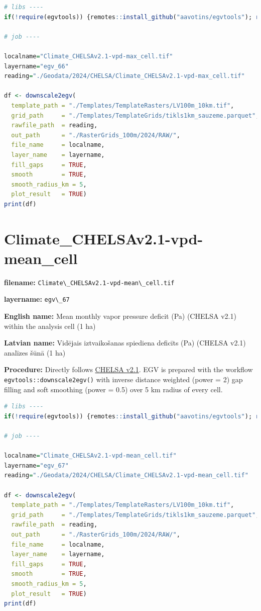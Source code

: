 \documentclass[
]{book}
\newcommand{\passthrough}[1]{#1}
\begin{document}
\begin{lstlisting}[language=R]
# libs ----
if(!require(egvtools)) {remotes::install_github("aavotins/egvtools"); require(egvtools)}

# job ----

localname="Climate_CHELSAv2.1-vpd-max_cell.tif"
layername="egv_66"
reading="./Geodata/2024/CHELSA/Climate_CHELSAv2.1-vpd-max_cell.tif"

df <- downscale2egv(
  template_path = "./Templates/TemplateRasters/LV100m_10km.tif",
  grid_path     = "./Templates/TemplateGrids/tikls1km_sauzeme.parquet",
  rawfile_path  = reading,
  out_path      = "./RasterGrids_100m/2024/RAW/",
  file_name     = localname,
  layer_name    = layername,
  fill_gaps     = TRUE,
  smooth        = TRUE,
  smooth_radius_km = 5,
  plot_result   = TRUE)
print(df)
\end{lstlisting}

\section{Climate\_CHELSAv2.1-vpd-mean\_cell}\label{ch06.067}

\textbf{filename:} \passthrough{\lstinline!Climate\_CHELSAv2.1-vpd-mean\_cell.tif!}

\textbf{layername:} \passthrough{\lstinline!egv\_67!}

\textbf{English name:} Mean monthly vapor pressure deficit (Pa) (CHELSA v2.1) within the analysis cell (1 ha)

\textbf{Latvian name:} Vidējais iztvaikošanas spiediena deficīts (Pa) (CHELSA v2.1) analīzes šūnā (1 ha)

\textbf{Procedure:} Directly follows \hyperref[Ch04.11]{CHELSA v2.1}. EGV is prepared with the
workflow \passthrough{\lstinline!egvtools::downscale2egv()!} with inverse distance weighted (power = 2)
gap filling and soft smoothing (power = 0.5) over 5 km radius of every cell.

\begin{lstlisting}[language=R]
# libs ----
if(!require(egvtools)) {remotes::install_github("aavotins/egvtools"); require(egvtools)}

# job ----

localname="Climate_CHELSAv2.1-vpd-mean_cell.tif"
layername="egv_67"
reading="./Geodata/2024/CHELSA/Climate_CHELSAv2.1-vpd-mean_cell.tif"

df <- downscale2egv(
  template_path = "./Templates/TemplateRasters/LV100m_10km.tif",
  grid_path     = "./Templates/TemplateGrids/tikls1km_sauzeme.parquet",
  rawfile_path  = reading,
  out_path      = "./RasterGrids_100m/2024/RAW/",
  file_name     = localname,
  layer_name    = layername,
  fill_gaps     = TRUE,
  smooth        = TRUE,
  smooth_radius_km = 5,
  plot_result   = TRUE)
print(df)
\end{lstlisting}
\end{document}
